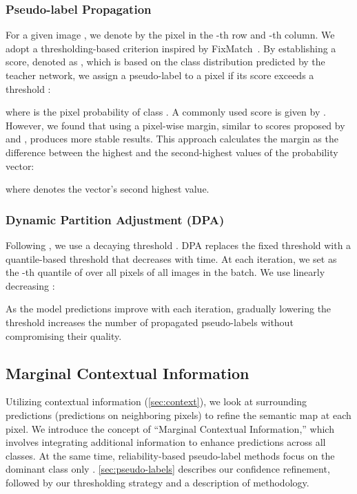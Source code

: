 \documentclass{article}
\renewcommand{\cite}[1]{\citep{#1}}
\begin{document}
\subsubsection{Pseudo-label Propagation} 
For a given image , we denote by  the pixel in the -th row and -th column.
We adopt a thresholding-based criterion inspired by FixMatch~\cite{sohn2020fixmatch}. By establishing a score, denoted as , which is based on the class distribution predicted by the teacher network, we assign a pseudo-label to a pixel if its score exceeds a threshold :

where  is the pixel probability of class . A commonly used score is given by  .
However, we found that using a pixel-wise margin, similar to scores proposed by \citet{Scheffer2001ActiveHM} and \citet{Shin2021AllYN}, produces more stable results. This approach calculates the margin as the difference between the highest and the second-highest values of the probability vector:

where  denotes the vector's second highest value.

\subsubsection{Dynamic Partition Adjustment (DPA)}\label{sec:DPA} Following \citet{wang2022semi}, we use a decaying threshold . DPA replaces the fixed threshold with a quantile-based threshold that decreases with time. At each iteration, we set  as the -th quantile of  over all pixels of all images in the batch. We use linearly decreasing :

As the model predictions improve with each iteration, gradually lowering the threshold increases the number of propagated pseudo-labels without compromising their quality.

\subsection{Marginal Contextual Information}\label{sec:s4n}
Utilizing contextual information (\cref{sec:context}), we look at surrounding predictions (predictions on  neighboring pixels) to refine the semantic map at each pixel. We introduce the concept of ``Marginal Contextual Information,'' which involves integrating additional information to enhance predictions across all classes. At the same time, reliability-based pseudo-label methods focus on the dominant class only \cite{sohn2020fixmatch, wang2023freematch}.
\cref{sec:pseudo-labels} describes our confidence refinement, followed by our thresholding strategy and a description of \methodname{} methodology. 
\end{document}
